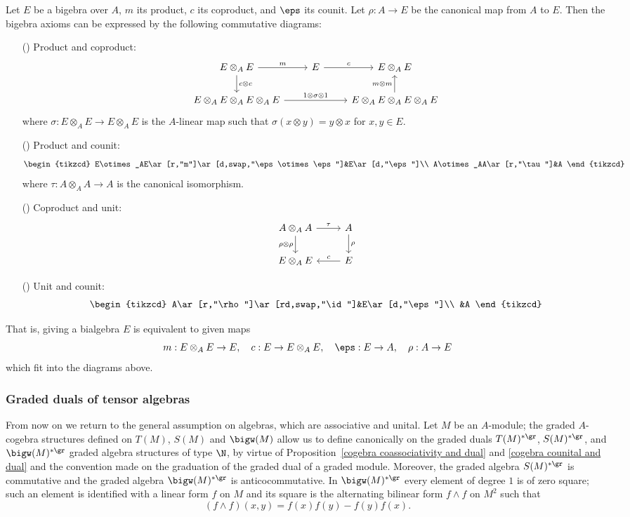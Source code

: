 \begin{remark}
Let $E$ be a bigebra over $A$, $m$ its product, $c$ its coproduct, and $\eps$ its counit. Let $\rho:A\to E$ be the canonical map from $A$ to $E$. Then the bigebra axioms can be expressed by the following commutative diagrams:
\begin{itemize}
\item[(\rmnum{1})] Product and coproduct:
\[\begin{tikzcd}
E\otimes_AE\ar[r,"m"]\ar[d,"c\otimes c"]&E\ar[r,"c"]&E\otimes_AE\\
E\otimes_AE\otimes_AE\otimes_AE\ar[rr,"1\otimes\sigma\otimes 1"]&&E\otimes_AE\otimes_AE\otimes_AE\ar[u,"m\otimes m"]
\end{tikzcd}\]
where $\sigma:E\otimes_AE\to E\otimes_AE$ is the $A$-linear map such that $\sigma(x\otimes y)=y\otimes x$ for $x,y\in E$.
\item[(\rmnum{2})] Product and counit:
\[\begin{tikzcd}
E\otimes_AE\ar[r,"m"]\ar[d,swap,"\eps\otimes\eps"]&E\ar[d,"\eps"]\\
A\otimes_AA\ar[r,"\tau"]&A
\end{tikzcd}\]
where $\tau:A\otimes_AA\to A$ is the canonical isomorphism.
\item[(\rmnum{3})] Coproduct and unit:
\[\begin{tikzcd}
A\otimes_AA\ar[r,"\tau"]\ar[d,swap,"\rho\otimes\rho"]&A\ar[d,"\rho"]\\
E\otimes_AE&E\ar[l,swap,"c"]
\end{tikzcd}\]
\item[(\rmnum{4})] Unit and counit:
\[\begin{tikzcd}
A\ar[r,"\rho"]\ar[rd,swap,"\id"]&E\ar[d,"\eps"]\\
&A
\end{tikzcd}\] 
\end{itemize}
That is, giving a bialgebra $E$ is equivalent to given maps
\[m:E\otimes_AE\to E,\quad c:E\to E\otimes_AE,\quad \eps:E\to A,\quad\rho:A\to E\]
which fit into the diagrams above.
\end{remark}
\subsubsection{Graded duals of tensor algebras}
From now on we return to the general assumption on algebras, which are associative and unital. Let $M$ be an $A$-module; the graded $A$-cogebra structures defined on $T(M)$, $S(M)$ and $\bigw(M)$ allow us to define canonically on the graded duals $T(M)^{*\gr}$, $S(M)^{*\gr}$, and $\bigw(M)^{*\gr}$ graded algebra structures of type $\N$, by virtue of Proposition~\ref{cogebra coassociativity and dual} and \ref{cogebra counital and dual} and the convention made on the graduation of the graded dual of a graded module. Moreover, the graded algebra $S(M)^{*\gr}$ is commutative and the graded algebra $\bigw(M)^{*\gr}$ is anticocommutative. In $\bigw(M)^{*\gr}$ every element of degree $1$ is of zero square; such an element is identified with a linear form $f$ on $M$ and its square is the alternating bilinear form $f\wedge f$ on $M^2$ such that
\[(f\wedge f)(x,y)=f(x)f(y)-f(y)f(x).\]

